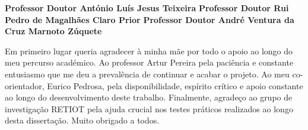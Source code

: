 \TitlePage
  \vspace*{55mm}
       {}
       {\textbf{Professor Doutor Ant\'onio Lu\'is Jesus Teixeira}}
  \vspace*{5mm}
       {\textbf{Professor Doutor Rui Pedro de Magalh\~aes Claro Prior}}
  \vspace*{5mm}
  \TEXT{}
       {\textbf{Professor Doutor Andr\'e Ventura da Cruz Marnoto Z\'uquete}}
\EndTitlePage
\titlepage\ \endtitlepage %

\TitlePage
  \vspace*{55mm}
       {Em primeiro lugar queria agradecer à minha mãe por todo o apoio ao
        longo do meu percurso académico. Ao professor Artur Pereira pela paciência e constante entusiasmo que me deu a prevalência de continuar e acabar o projeto.
     Ao meu co-orientador, Eurico Pedrosa, pela disponibilidade, espírito
crítico e apoio constante ao longo do desenvolvimento deste trabalho.
Finalmente, agradeço ao grupo de investigação RETIOT pela ajuda
crucial nos testes práticos realizados ao longo desta dissertação.
Muito obrigado a todos.
       }
  \TEXT{}
       {%
       }

